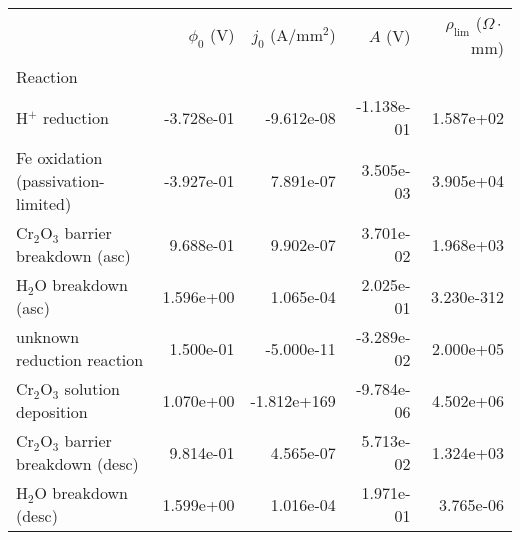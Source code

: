 \begin{tabular}{lrrrr}
\toprule
{} &  $\phi_0$ (V) &  $j_0$ (A/mm$^2$) &    $A$ (V) &  $\rho_{\text{lim}}$ ($\Omega \cdot$mm) \\
Reaction                             &               &                   &            &                                         \\
\midrule
H$^+$ reduction                      &    -3.728e-01 &        -9.612e-08 & -1.138e-01 &                               1.587e+02 \\
Fe oxidation (passivation-limited)   &    -3.927e-01 &         7.891e-07 &  3.505e-03 &                               3.905e+04 \\
Cr$_2$O$_3$ barrier breakdown (asc)  &     9.688e-01 &         9.902e-07 &  3.701e-02 &                               1.968e+03 \\
H$_2$O breakdown (asc)               &     1.596e+00 &         1.065e-04 &  2.025e-01 &                              3.230e-312 \\
unknown reduction reaction           &     1.500e-01 &        -5.000e-11 & -3.289e-02 &                               2.000e+05 \\
Cr$_2$O$_3$ solution deposition      &     1.070e+00 &       -1.812e+169 & -9.784e-06 &                               4.502e+06 \\
Cr$_2$O$_3$ barrier breakdown (desc) &     9.814e-01 &         4.565e-07 &  5.713e-02 &                               1.324e+03 \\
H$_2$O breakdown (desc)              &     1.599e+00 &         1.016e-04 &  1.971e-01 &                               3.765e-06 \\
\bottomrule
\end{tabular}
